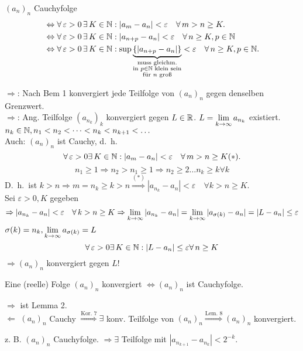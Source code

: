 \documentclass[../ana1.tex]{subfiles}
\begin{document}
\begin{bem}
	\( {(a_n)}_n \) Cauchyfolge \\
	\begin{align*}
		&\Leftrightarrow \forall \varepsilon>0 \,\exists K\in\N:|a_m-a_n|<\varepsilon \quad \forall m>n\geq K.\\
		&\Leftrightarrow \forall \varepsilon>0 \,\exists K\in\N:|a_{n+p}-a_n|<\varepsilon \quad \forall n\geq K, p\in\N \\
		&\Leftrightarrow \forall \varepsilon>0 \,\exists K\in\N:\sup \underbrace{\set{|a_{n+p}-a_n|}}_{\substack{\text{muss gleichm.}\\\text{in }p\in\N\text{ klein sein}\\ \text{für } n \text{ groß} }}<\varepsilon \quad \forall n\geq K, p\in\N.
	\end{align*}
\end{bem}
\begin{bew}
	\glqq{}\( \Rightarrow \)\grqq{}: Nach Bem 1 konvergiert jede Teilfolge von \( {(a_n)}_n \) gegen denselben Grenzwert.\\
	\glqq{}\(\Rightarrow \)\grqq{}: Ang. Teilfolge \( {(a_{n_k})}_k \) konvergiert gegen \(L\in\mathbb{R} \). \(L = \lim\limits_{k\rightarrow\infty} a_{n_k} \) existiert.\\
	\( n_k\in\mathbb{N}, n_1<n_2<\cdots<n_k<n_{k+1}<\ldots \) \\
	Auch: \({(a_n)}_n\) ist Cauchy, d.\ h.\ 
	\[ \forall \varepsilon>0\exists K\in\N:|a_m-a_n|<\varepsilon \quad\forall m>n\geq K (*). \]
	\[n_1 \geq 1 \Rightarrow n_2 > n_1 \geq 1 \Rightarrow n_2 \geq 2 \ldots n_k \geq k \forall k \]
	D.\ h.\ ist \(k>n \Rightarrow m=n_k \geq k>n \overset{(*)}{\Rightarrow} |a_{n_k}-a_n|<\varepsilon \quad \forall k>n\geq K \).\\
	Sei \( \varepsilon>0, K\) gegeben\\
	\[ \Rightarrow |a_{n_k} - a_n| <\varepsilon \quad \forall k>n\geq K \Rightarrow \limes{k} |a_{n_k}-a_n| = \limes{k} |a_{\sigma(k)}-a_n| = |L-a_n| \leq \varepsilon \]
	\(\sigma(k) = n_k, \lim\limits_{k\rightarrow\infty} a_{\sigma(k)} = L \)
	\[ \forall \varepsilon>0 \exists K\in\N: |L-a_n|\leq \varepsilon \forall n\geq K \]
	\(\Rightarrow {(a_n)}_n\) konvergiert gegen \(L\)!
\end{bew}
\begin{satz}
	Eine (reelle) Folge \({(a_n)}_n\) konvergiert \( \Leftrightarrow {(a_n)}_n \) ist Cauchyfolge.
\end{satz}
\begin{bew}
	\glqq{}\(\Rightarrow \)\grqq{} ist Lemma 2.\\
	\glqq{}\( \Leftarrow \)\grqq{} \({(a_n)}_n\) Cauchy \( \overset{\text{Kor. 7}}{\Rightarrow} \exists \) konv. Teilfolge von \({(a_n)}_n \overset{\text{Lem. 8}}{\Rightarrow} {(a_n)}_n \) konvergiert. 
\end{bew}
z. B. \({(a_n)}_n\) Cauchyfolge. \(\Rightarrow \exists \) Teilfolge mit \(|a_{n_{k+1}}-a_{n_k}| <2^{-k}\).
\end{document}
